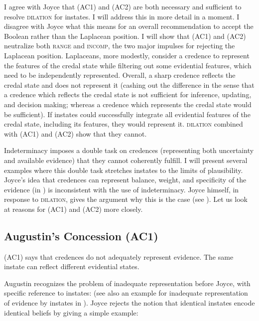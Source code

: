 \documentclass[11pt]{article}
\begin{document}
I agree with Joyce that (AC1) and (AC2) are both necessary and
sufficient to resolve \textsc{dilation} for instates. I will address
this in more detail in a moment. I disagree with Joyce what this means
for an overall recommendation to accept the Boolean rather than the
Laplacean position. I will show that (AC1) and (AC2) neutralize both
\textsc{range} and \textsc{incomp}, the two major impulses for
rejecting the Laplacean position. Laplaceans, more modestly, consider
a credence to represent the {\doxnotep} features of the credal state
while filtering out some evidential features, which need to be
independently represented. Overall, a sharp credence reflects the
credal state and does not represent it (cashing out the difference in
the sense that a credence which reflects the credal state is not
sufficient for inference, updating, and decision making; whereas a
credence which represents the credal state would be sufficient). If
instates could successfully integrate all evidential features of the
credal state, including its {\doxnotep} features, they would represent
it. \textsc{dilation} combined with (AC1) and (AC2) show that they
cannot.

Indeterminacy imposes a double task on credences (representing both
uncertainty and available evidence) that they cannot coherently
fulfill. I will present several examples where this double task
stretches instates to the limits of plausibility. Joyce's idea that
credences can represent balance, weight, and specificity of the
evidence (in ) is inconsistent with the use of
indeterminacy. Joyce himself, in response to \textsc{dilation}, gives
the argument why this is the case (see
). Let us look at reasons for (AC1)
and (AC2) more closely.

\subsection{Augustin's Concession (AC1)}
\label{jj1}

(AC1) says that credences do not adequately represent evidence. The
same instate can reflect different evidential states.

Augustin recognizes the problem of inadequate representation before
Joyce, with specific reference to instates:   (see also an example for
inadequate representation of evidence by instates in
). Joyce rejects the notion that
identical instates encode identical beliefs by giving a simple
example:
\end{document}
